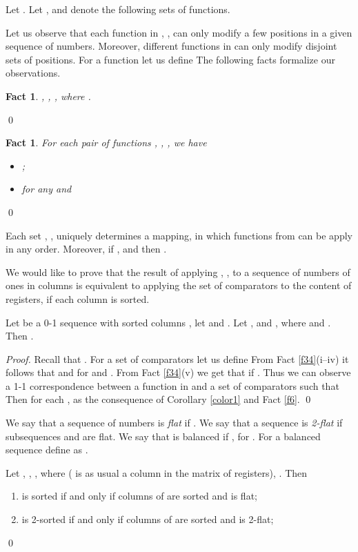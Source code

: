\documentclass{llncs}
\newtheorem{fact}[theorem]{Fact}
\begin{document}
\begin{definition} \label{defQ}
Let . Let ,  and  denote the following sets
of functions.
\
\end{definition}
Let us observe that each function in , , can only modify
a few positions in a given sequence of numbers. Moreover, different
functions in  can only modify disjoint sets of positions. For a
function  let us
define  The following facts
formalize our observations.
\begin{fact}
, , 
    , where .
\end{fact} \qed
\begin{fact}
For each pair of functions , , , we have
\begin{itemize}
\item[(i)] ;
\item[(ii)] for any  and 
                                                  

\end{itemize} 
\end{fact}  \qed
\begin{corollary} \label{color1}
Each set , , uniquely determines a mapping, in which
functions from  can be apply in any order. Moreover, if ,  and  then
.
\end{corollary}
We would like to prove that the result of applying , ,
to a sequence  of numbers of ones in
columns  is equivalent to applying the set of
comparators  to the content of registers, if each column is
sorted.
\begin{lemma} \label{l2}
Let  be a 0-1 sequence with sorted columns , let  and . Let , 
  and , where
   and . Then .
\end{lemma}
\begin{proof}
Recall that . For a set of comparators  let us define
 From Fact \ref{f34}(i--iv) it follows that
 and for   and . From Fact \ref{f34}(v) we get that  if . Thus we can observe a 1-1
correspondence between a function  in  and a set of
comparators  such that
 Then for each 
, as
the consequence of Corollary \ref{color1} and Fact \ref{f6}. \qed
\end{proof}
\begin{definition} \label{flat}
We say that a sequence of numbers 
is {\em flat} if . We say that
a sequence  is {\em 2-flat} if subsequences
 and  are flat. We
say that  is balanced if ,
for . For a balanced sequence  define 
 as .
\end{definition}
\begin{proposition} \label{p3}
Let , , , where  ( is as usual a
column in the matrix of registers), . Then
\begin{enumerate}
\item  is sorted if and only if columns of  are sorted  and 
 is flat;
\item  is 2-sorted if and only if columns of  are sorted and 
 is 2-flat;
\end{enumerate}
\end{proposition} \qed
\end{document}
